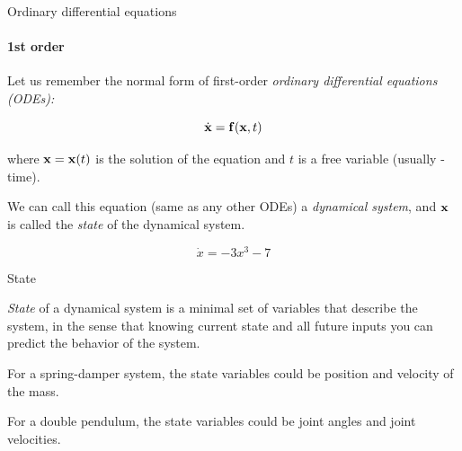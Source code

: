 \documentclass{beamer}
\begin{document}
\begin{frame}{Ordinary differential equations}
\framesubtitle{1st order}
\begin{flushleft}

Let us remember the normal form of first-order \emph{ordinary differential equations (ODEs):}

\begin{equation}
    \dot{\mathbf{x}} = \mathbf{f} (\mathbf{x}, t)
\end{equation}

where $\mathbf{x} = \mathbf{x}(t)$ is the solution of the equation and $t$ is a free variable (usually - time).

\bigskip

\begin{definition}
We can call this equation (same as any other ODEs) a \emph{dynamical system}, and $\mathbf{x}$ is called the \emph{state} of the dynamical system.  
\end{definition}

\begin{example}
\begin{equation}
    \dot{x} = -3 x^3 - 7 
\end{equation}
\end{example}

\end{flushleft}
\end{frame}




\begin{frame}{State}
	\begin{flushleft}
		
		\emph{State} of a dynamical system is a minimal set of variables that describe the system, in the sense that knowing current state and all future inputs you can predict the behavior of the system.
		
		\begin{example}
			For a spring-damper system, the state variables could be position and velocity of the mass.
		\end{example} 
		\begin{example}
			For a double pendulum, the state variables could be joint angles and joint velocities.
		\end{example} 
		
	\end{flushleft}
\end{frame}
\end{document}
